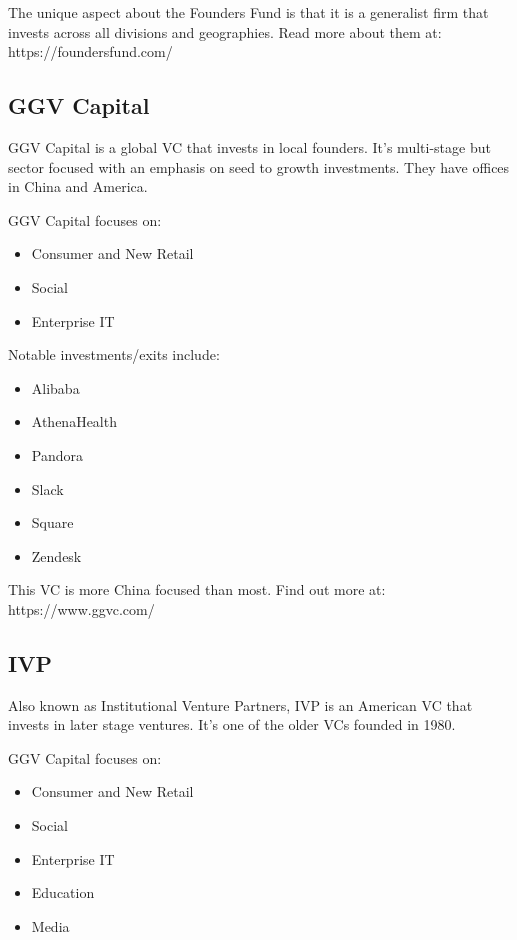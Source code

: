 \documentclass[a4paper]{article}
\begin{document}
{\vspace{5pt}
\noindent The unique aspect about the Founders Fund is that it is a generalist firm that invests across all divisions and geographies. Read more about them at: https://foundersfund.com/

\subsection{GGV Capital}
GGV Capital is a global VC that invests in local founders. It's multi-stage but sector focused with an emphasis on seed to growth investments. They have offices in China and America.

\vspace{5pt}
\noindent GGV Capital focuses on:
\begin{itemize}
	\item Consumer and New Retail
	\item Social
	\item Enterprise IT
\end{itemize}

\vspace{5pt}
\noindent Notable investments/exits include:
\begin{itemize}
	\item Alibaba
	\item AthenaHealth
	\item Pandora
	\item Slack
	\item Square
	\item Zendesk
\end{itemize}

\vspace{5pt}
\noindent This VC is more China focused than most. Find out more at: https://www.ggvc.com/

\subsection{IVP}
Also known as Institutional Venture Partners, IVP  is an American VC that invests in later stage ventures. It's one of the older VCs founded in 1980.

\vspace{5pt}
\noindent GGV Capital focuses on:
\begin{itemize}
	\item Consumer and New Retail
	\item Social
	\item Enterprise IT
	\item Education
	\item Media
\end{itemize}

}
\end{document}
